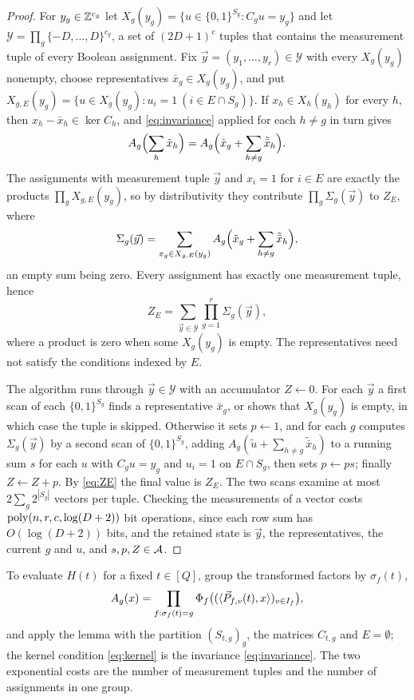 \begin{proof}
For $y_g\in\mathbb{Z}^{c_g}$ let $X_g(y_g)=\{u\in\{0,1\}^{S_g}:C_gu=y_g\}$ and let
$\mathcal Y=\prod_g\{-D,\dots,D\}^{c_g}$, a set of $(2D+1)^{c}$ tuples that
contains the measurement tuple of every Boolean assignment. Fix
$\vec y=(y_1,\dots,y_r)\in\mathcal Y$ with every $X_g(y_g)$ nonempty, choose
representatives $\bar x_g\in X_g(y_g)$, and put
$X_{g,E}(y_g)=\{u\in X_g(y_g):u_i=1\ (i\in E\cap S_g)\}$. If $x_h\in X_h(y_h)$
for every $h$, then $x_h-\bar x_h\in\ker C_h$, and \eqref{eq:invariance} applied
for each $h\ne g$ in turn gives
\[
  A_g\Bigl(\sum_{h}\tilde x_h\Bigr)=A_g\Bigl(\tilde x_g+\sum_{h\ne g}\tilde{\bar x}_h\Bigr).
\]
The assignments with measurement tuple $\vec y$ and $x_i=1$ for $i\in E$ are
exactly the products $\prod_gX_{g,E}(y_g)$, so by distributivity they contribute
$\prod_g\Sigma_g(\vec y)$ to $Z_E$, where
\begin{equation}\label{eq:Sigma}
  \Sigma_g(\vec y)=\sum_{x_g\in X_{g,E}(y_g)}A_g\Bigl(\tilde x_g+\sum_{h\ne g}\tilde{\bar x}_h\Bigr),
\end{equation}
an empty sum being zero. Every assignment has exactly one measurement tuple, hence
\begin{equation}\label{eq:ZE}
  Z_E=\sum_{\vec y\in\mathcal Y}\prod_{g=1}^{r}\Sigma_g(\vec y),
\end{equation}
where a product is zero when some $X_g(y_g)$ is empty. The representatives need
not satisfy the conditions indexed by $E$.

The algorithm runs through $\vec y\in\mathcal Y$ with an accumulator $Z\leftarrow 0$.
For each $\vec y$ a first scan of each $\{0,1\}^{S_g}$ finds a representative
$\bar x_g$, or shows that $X_g(y_g)$ is empty, in which case the tuple is skipped.
Otherwise it sets $p\leftarrow 1$, and for each $g$ computes $\Sigma_g(\vec y)$ by a
second scan of $\{0,1\}^{S_g}$, adding $A_g(\tilde u+\sum_{h\ne g}\tilde{\bar x}_h)$
to a running sum $s$ for each $u$ with $C_gu=y_g$ and $u_i=1$ on $E\cap S_g$,
then sets $p\leftarrow ps$; finally $Z\leftarrow Z+p$. By \eqref{eq:ZE} the final
value is $Z_E$. The two scans examine at most $2\sum_g2^{|S_g|}$ vectors per
tuple. Checking the measurements of a vector costs $\operatorname{poly}(n,r,c,\log(D+2))$
bit operations, since each row sum has $O(\log(D+2))$ bits, and the retained
state is $\vec y$, the representatives, the current $g$ and $u$, and $s,p,Z\in\mathcal{A}$.
\end{proof}

To evaluate $H(t)$ for a fixed $t\in[Q]$, group the transformed factors by
$\sigma_f(t)$,
\[
  A_g(x)=\prod_{f:\sigma_f(t)=g}\Phi_f\bigl((\langle \vec{P}_{f,v}(t),x\rangle)_{v\in I_f}\bigr),
\]
and apply the lemma with the partition $(S_{t,g})_g$, the matrices $C_{t,g}$ and
$E=\emptyset$; the kernel condition \eqref{eq:kernel} is the invariance
\eqref{eq:invariance}. The two exponential costs are the number of measurement
tuples and the number of assignments in one group.

